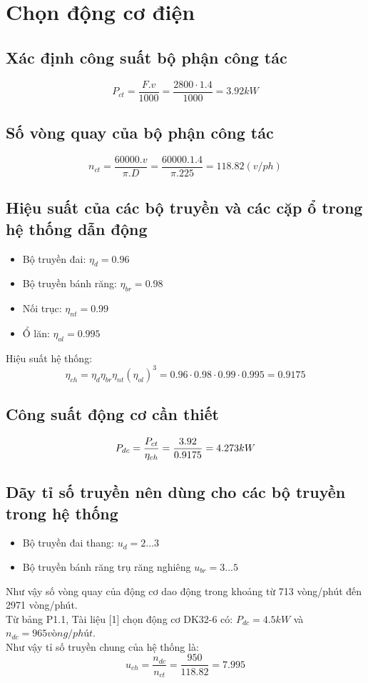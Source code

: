\section{Chọn động cơ điện}
\subsection{Xác định công suất bộ phận công tác}
\[
    P_{ct} = \frac{F.v}{1000} = \frac{2800 \cdot 1.4}{1000} = 3.92 kW
\]
\subsection{Số vòng quay của bộ phận công tác}
\begin{center}
\[
    n_{ct} = \frac{60000.v}{\pi.D} = \frac{60000.1.4}{\pi.225} = 118.82 (v/ph)
\]
\end{center}
\subsection{Hiệu suất của các bộ truyền và các cặp ổ trong hệ thống dẫn động}
\begin{itemize}
    \item Bộ truyền đai: $\eta_{d} = 0.96$ 
    \item Bộ truyền bánh răng: $\eta_{br} = 0.98$
    \item Nối trục: $\eta_{nt} = 0.99$
    \item Ổ lăn: $\eta_{ol} = 0.995$
\end{itemize}
Hiệu suất hệ thống:
\[
    \eta _{ch} = \eta_{d}\eta_{br}\eta_{nt}(\eta_{ol})^3 = 0.96 \cdot 0.98 \cdot 0.99 \cdot 0.995 = 0.9175
\]
\subsection{Công suất động cơ cần thiết}
\[
    P_{dc} = \frac{P_{ct}}{\eta_{ch}} = \frac{3.92}{0.9175} = 4.273 kW\\
\]    
\subsection{Dãy tỉ số truyền nên dùng cho các bộ truyền trong hệ thống}

\begin{itemize}
    \item Bộ truyền đai thang: $u_{d} = 2...3$
    \item Bộ truyền bánh răng trụ răng nghiêng $u_{br} = 3...5$
\end{itemize}
Như vậy số vòng quay của động cơ dao động trong khoảng từ 713 vòng/phút đến 2971 vòng/phút.\\
Từ bảng P1.1, Tài liệu [1] chọn động cơ DK32-6 có: $P_{dc} = 4.5 kW$ và $n_{dc} = 965 vòng/phút$. \\
Như vậy tỉ số truyền chung của hệ thống là:
\[
    u_{ch} =\frac{n_{dc}}{n_{ct}} = \frac{950}{118.82} = 7.995
\]

